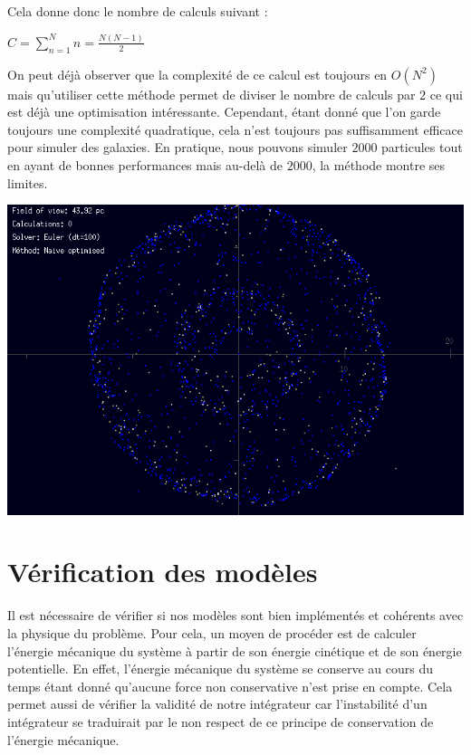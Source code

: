 \vspace{2mm}
Cela donne donc le nombre de calculs suivant :
\vspace{1mm}

$C=\sum_{n=1}^N n = \frac{N(N-1)}{2}$

\vspace{2mm}
On peut déjà observer que la complexité de ce calcul est toujours  en $O(N^2)$ mais qu'utiliser cette méthode permet de diviser le nombre de calculs par $2$ ce qui est déjà une optimisation intéressante. Cependant, étant donné que l'on garde toujours une complexité quadratique, cela n'est toujours pas suffisamment efficace pour simuler des galaxies. En pratique, nous pouvons simuler $2000$ particules tout en ayant de bonnes performances mais au-delà de $2000$, la méthode montre ses limites.

\begin{center}
\includegraphics[scale=0.8]{images/NO.png}
\captionsetup{hypcap=false}
\label{fig3}
\end{center} 

\section{Vérification des modèles}

Il est nécessaire de vérifier si nos modèles sont bien implémentés et cohérents avec la physique du problème. Pour cela, un moyen de procéder est de calculer l'énergie mécanique du système à partir de son énergie cinétique et de son énergie potentielle. En effet, l'énergie mécanique du système se conserve au cours du temps étant donné qu'aucune force non conservative n'est prise en compte.
Cela permet aussi de vérifier la validité de notre intégrateur car l'instabilité d'un intégrateur se traduirait par le non respect de ce principe de conservation de l'énergie mécanique.

